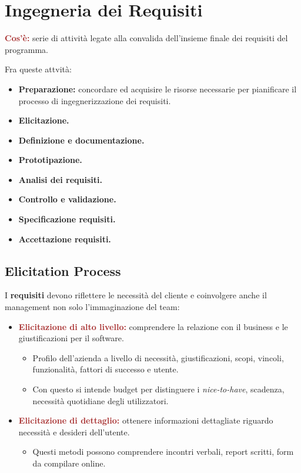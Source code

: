 \chapter{Ingegneria dei Requisiti}

\begin{boxDef}
\textbf{\textcolor{brown}{Cos'è:}} serie di attività legate alla convalida dell'insieme finale dei requisiti del programma.
\end{boxDef}
Fra queste attvità:
\begin{itemize}
    \item \textbf{Preparazione:} concordare ed acquisire le risorse necessarie per pianificare il processo di ingegnerizzazione dei requisiti.
    \item \textbf{Elicitazione.}
    \item \textbf{Definizione e documentazione.}
    \item \textbf{Prototipazione.}
    \item \textbf{Analisi dei requisiti.}
    \item \textbf{Controllo e validazione.}
    \item \textbf{Specificazione requisiti.}
    \item \textbf{Accettazione requisiti.}
\end{itemize} 

\section{Elicitation Process}
I \textbf{requisiti} devono riflettere le necessità del cliente e coinvolgere anche il management non solo l'immaginazione del team:
\begin{itemize}
    \item \textbf{\textcolor{brown}{Elicitazione di alto livello:}} comprendere la relazione con il business e le giustificazioni per il software.
    \begin{itemize}
        \item Profilo dell'azienda a livello di necessità, giustificazioni, scopi, vincoli, funzionalità, fattori di successo e utente.
        \item Con questo si intende budget per distinguere i \textit{nice-to-have}, scadenza, necessità quotidiane degli utilizzatori.
    \end{itemize}
    \item \textbf{\textcolor{brown}{Elicitazione di dettaglio:}} ottenere informazioni dettagliate riguardo necessità e desideri dell'utente.
    \begin{itemize}
        \item Questi metodi possono comprendere incontri verbali, report scritti, form da compilare online.
    \end{itemize}
\end{itemize}

